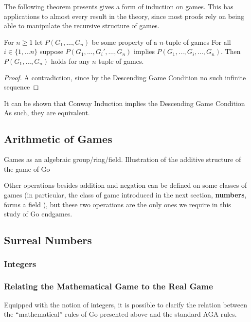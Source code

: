 \documentclass[../math194_paper.tex]{subfiles}
\begin{document}
The following theorem presents gives a form of induction on games. 
This has applications to almost every result in the theory, since most 
proofs rely on being able to manipulate the recursive structure of games.

\begin{theorem}
\label{induction}
For $n \geq 1$ let $P(G_1, \ldots, G_n)$ be some property of a $n$-tuple of games 
For all $i \in \{1, \ldots n\}$ suppose $P(G_1, \ldots, G_i', \ldots, G_n)$ implies 
$P(G_1, \ldots, G_i, \ldots, G_n)$. Then $P(G_1, \ldots, G_n)$ holds for any $n$-tuple 
of games.
\end{theorem}

\begin{proof}
    A contradiction, since by the Descending Game Condition no such infinite sequence 
\end{proof}

It can be shown that Conway Induction implies the Descending Game Condition \cite{schleicher2006introduction}
As such, they are equivalent.

\subsection{Arithmetic of Games}
Games as an algebraic group/ring/field. Illustration of the additive 
structure of the game of Go


Other operations besides addition and negation can be defined on some 
classes of games (in particular, the class of game introduced in the next section, 
\textbf{numbers}, forms a field \cite{schleicher2006introduction}),
 but these two operations are the only ones we require in this study of Go endgames. 

\subsection{Surreal Numbers}

\subsubsection{Integers} 

\subsubsection{Relating the Mathematical Game to the Real Game}

Equipped with the notion of integers, it is possible to clarify the relation 
between the ``mathematical'' rules of Go presented above and the standard AGA 
rules.
\end{document}
